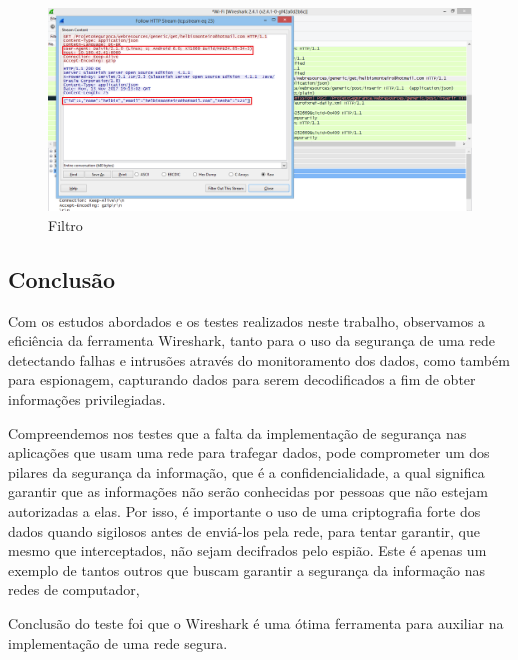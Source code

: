 \documentclass[12pt]{article}
\begin{document}
\begin{figure}[ht]
\centering
\includegraphics[width=.5\textwidth]{02.png}
\caption{Filtro}
\label{fig:exampleFig6}
\end{figure}


\subsection{Conclusão}

	Com os estudos abordados e os testes realizados neste trabalho, observamos a eficiência da ferramenta Wireshark, tanto para o uso da segurança de uma rede detectando falhas e intrusões através do monitoramento dos dados, como também para espionagem, capturando dados para serem decodificados a fim de obter informações privilegiadas. 

Compreendemos nos testes que a falta da implementação de segurança nas aplicações que usam uma rede para trafegar dados, pode comprometer um dos pilares da segurança da informação, que é a confidencialidade, a qual significa garantir que as informações não serão conhecidas por pessoas que não estejam autorizadas a elas. Por isso, é importante o uso de uma criptografia forte dos dados quando sigilosos antes de enviá-los pela rede, para tentar garantir, que mesmo que interceptados, não sejam decifrados pelo espião. Este é apenas um exemplo de tantos outros que buscam garantir a segurança da informação nas redes de computador, 

Conclusão do teste foi que o Wireshark é uma ótima ferramenta para auxiliar na implementação de uma rede segura.



\end{document}
